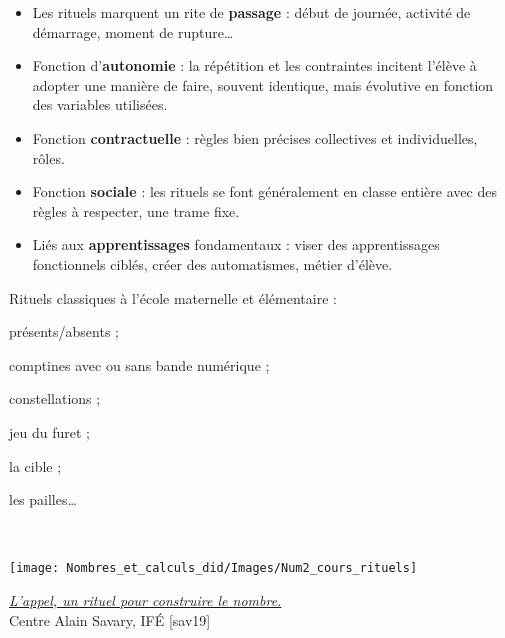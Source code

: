 {\renewcommand{\StringDOCUMENTATION}{Fonctions principales des rituels}
\begin{documentation}
   \begin{itemize}
      \item Les rituels marquent un rite de {\bf passage} : début de journée, activité de démarrage, moment de rupture\dots
      \item Fonction d'{\bf autonomie} : la répétition et les contraintes incitent l'élève à adopter une manière de faire, souvent identique, mais évolutive en fonction des variables utilisées.
      \item Fonction {\bf contractuelle} : règles bien précises collectives et individuelles, rôles.
      \item Fonction {\bf sociale} : les rituels se font généralement en classe entière avec des règles à respecter, une trame fixe. 
      \item Liés aux {\bf apprentissages} fondamentaux : viser des apprentissages fonctionnels ciblés, créer des automatismes, métier d'élève. \\ [-8mm]
   \end{itemize}
\end{documentation}}

\begin{exemple*1}
{\small
   Rituels classiques à l'école maternelle et élémentaire : 
   \begin{colitemize}{2}
      \item présents/absents ;
      \item comptines avec ou sans bande numérique ;
      \item constellations ;
      \item jeu du furet ;
      \item la cible ;
      \item les pailles\dots 
   \end{colitemize}}
   \ \\ [-10mm]
\end{exemple*1}

\begin{center}
   \begin{minipage}{6.5cm}
      \texttt{[image: Nombres\_et\_calculs\_did/Images/Num2\_cours\_rituels]}
   \end{minipage}
   \qquad
      \begin{minipage}{6cm}
   {\it\blue \href{http://centre-alain-savary.ens-lyon.fr/CAS/mathematiques-en-education-prioritaire/premieres-annees-de-mathernelle-1/situations-de-classe-et-entretien/lappel-emilie-et-elisabeth}{L'appel, un rituel pour construire le nombre.}} \\
   Centre Alain Savary, IFÉ [sav19]
\end{minipage}
\end{center}

